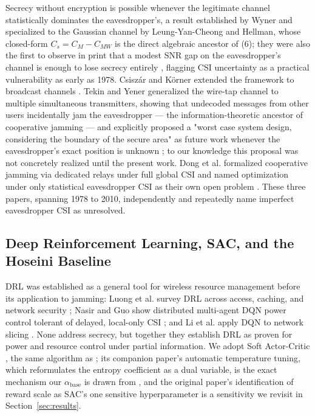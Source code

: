 \documentclass[conference]{IEEEtran}
\begin{document}
Secrecy without encryption is possible whenever the legitimate channel statistically dominates the eavesdropper's, a result established by Wyner \cite{wyner} and specialized to the Gaussian channel by Leung-Yan-Cheong and Hellman, whose closed-form $C_s = C_M - C_{MW}$ is the direct algebraic ancestor of (6); they were also the first to observe in print that a modest SNR gap on the eavesdropper's channel is enough to lose secrecy entirely \cite{gaussian}, flagging CSI uncertainty as a practical vulnerability as early as 1978. Csiszár and Körner extended the framework to broadcast channels \cite{broadcast}. Tekin and Yener generalized the wire-tap channel to multiple simultaneous transmitters, showing that undecoded messages from other users incidentally jam the eavesdropper --- the information-theoretic ancestor of cooperative jamming --- and explicitly proposed a "worst case system design, considering the boundary of the secure area" as future work whenever the eavesdropper's exact position is unknown \cite{tekin}; to our knowledge this proposal was not concretely realized until the present work. Dong et al. formalized cooperative jamming via dedicated relays under full global CSI and named optimization under only statistical eavesdropper CSI as their own open problem \cite{dong}. These three papers, spanning 1978 to 2010, independently and repeatedly name imperfect eavesdropper CSI as unresolved.

\subsection{Deep Reinforcement Learning, SAC, and the Hoseini Baseline}

DRL was established as a general tool for wireless resource management before its application to jamming: Luong et al. survey DRL across access, caching, and network security \cite{luong}; Nasir and Guo show distributed multi-agent DQN power control tolerant of delayed, local-only CSI \cite{nasir}; and Li et al. apply DQN to network slicing \cite{slice}. None address secrecy, but together they establish DRL as proven for power and resource control under partial information. We adopt Soft Actor-Critic \cite{sac1}, the same algorithm as \cite{hoseini}; its companion paper's automatic temperature tuning, which reformulates the entropy coefficient as a dual variable, is the exact mechanism our $\alpha_{\text{base}}$ is drawn from \cite{sac2}, and the original paper's identification of reward scale as SAC's one sensitive hyperparameter \cite{sac1} is a sensitivity we revisit in Section~\ref{sec:results}.
\end{document}
